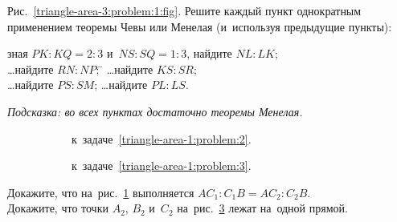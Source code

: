 \begin{problems}

\item
\label{triangle-area-3:problem:1}%
Рис.~\ref{triangle-area-3:problem:1:fig}.
Решите каждый пункт однократным применением теоремы Чевы или Менелая
(и~используя предыдущие пункты):
\begin{tabbing}
\subproblem
зная $PK : KQ = 2 : 3$ и~$NS : SQ = 1 : 3$,
найдите $NL : LK$;
\\
\subproblem
\ldots найдите $RN : NP$;
\qquad\=
\subproblem
\ldots найдите $KS : SR$;
\\
\subproblem
\ldots найдите $PS : SM$;
\qquad\>
\subproblem
\ldots найдите $PL : LS$.
\end{tabbing}
\emph{Подсказка: во всех пунктах достаточно теоремы Менелая.}

\begin{figure}[hb]
\leavevmode\null\hfill
    \begin{subfigure}{0.42\textwidth}
        \caption{к~задаче~\ref{triangle-area-1:problem:2}.}
        \label{triangle-area-3:problem:2:fig}
    \end{subfigure}
\hfill
    \begin{subfigure}{0.3\textwidth}
        \caption{к~задаче~\ref{triangle-area-1:problem:3}.}
        \label{triangle-area-3:problem:3:fig}
    \end{subfigure}
\hfill\null\par
    \caption{}
\end{figure}


\item
\subproblem
\label{triangle-area-1:problem:2}%
Докажите, что
на~рис.~\ref{triangle-area-3:problem:2:fig}
выполняется $A C_1 : C_1 B = A C_2 : C_2 B$.
\\
\subproblemx{*}
\label{triangle-area-1:problem:3}%
Докажите, что точки $A_2$, $B_2$ и~$C_2$
на~рис.~\ref{triangle-area-3:problem:3:fig}
лежат на~одной прямой.

\end{problems}



